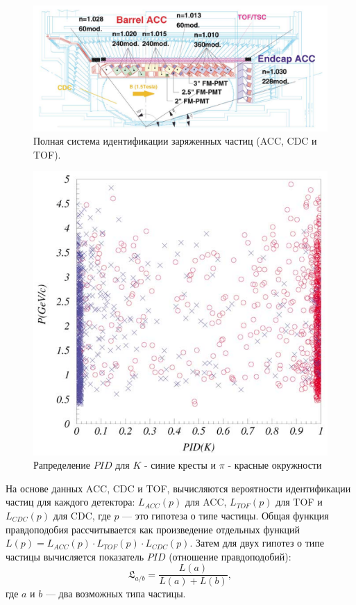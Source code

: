 \begin{figure}[!htb]
    \centering
    \includegraphics[width=1\linewidth]{img/Ch_hadr_id.png}
    \caption{Полная система идентификации заряженных частиц (ACC, CDC и TOF).}
    \label{the:ch_hadr_id}
\end{figure}

\begin{figure}
    \centering
    \includegraphics[width=0.7\linewidth]{img/L_P.png}
    \caption{Рапределение $PID$ для $K$ - синие кресты и $\pi$ - красные окружности}
    \label{the:li}
\end{figure}

На основе данных ACC, CDC и TOF, вычисляются вероятности идентификации частиц для каждого детектора: $L_{ACC}(p)$ для ACC, 
$L_{TOF}(p)$ для TOF и $L_{CDC}(p)$ для CDC, где $p$ --- это гипотеза о типе частицы. 
Общая функция правдоподобия рассчитывается как произведение отдельных функций 
$L(p) = L_{ACC}(p) \cdot L_{TOF}(p) \cdot L_{CDC}(p)$.
Затем для двух гипотез о типе частицы вычисляется показатель $PID$ (отношение правдоподобий):
\begin{equation}
    \mathfrak{L}_{a/b} = \frac{L(a)}{L(a) + L(b)},
\end{equation}
где $a$ и $b$ — два возможных типа частицы.

